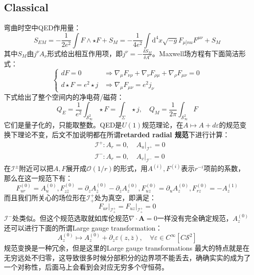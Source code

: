 \subsection{Classical}
弯曲时空中QED作用量：
\begin{equation}
	S_{EM}=-\frac{1}{2e^2}\int{F}\wedge\star F +S_M=-\frac{1}{4e^2}\int \mathrm{d}^4x\sqrt{-g}F_{\mu]nu}F^{\mu\nu}+S_M
\end{equation}
其中$S_M$由$j^\nu A_\nu$形式给出相互作用项，即$j^\nu=-\frac{\delta S_M}{\delta A^\nu}$。Maxwell场方程有下面简洁形式：
\begin{equation}
	\begin{cases}
		dF=0&\Rightarrow \nabla_\mu F_{\nu\rho}+\nabla_\nu F_{\rho\mu}+\nabla_\rho F_{\mu\nu}=0\\
		d\star F=e^2\star j&\Rightarrow \nabla_\mu F_{\mu\nu}=e^2j_\nu
	\end{cases}
\end{equation}
下式给出了整个空间内的净电荷/磁荷：
\begin{equation}
	Q_E=\frac{1}{e^2}\int_{\mathcal{S}^2_\infty}\star F=\int_{\Sigma}\star j,\quad Q_M=\frac{1}{2\pi}\int_{\mathcal{S}^2_\infty} F
\end{equation}
它们是量子化的，只能取整数。QED是$U(1)$规范理论，在$A\mapsto A+d\varepsilon$的规范变换下理论不变，后文不加说明都在所谓\textbf{retarded radial 规范}下进行计算\cite{He:2014cra,Kapec:2015ena}：
\begin{equation}
	\begin{aligned}
		&\mathcal{I}^+: A_r=0,\quad A_u|_{\mathcal{I}^+}=0\\
		&\mathcal{I}^-: A_r=0,\quad A_v|_{\mathcal{I}^-}=0
	\end{aligned}
\end{equation}
在$\mathcal{I}^{\pm}$附近可以把$A,F$展开成$\mathcal{O}(1/r)$的形式，用$A^{(i)},F^{(i)}$表示$r^{-i}$项前的系数，那么在这一规范下有：
\begin{equation}
	F_{ur}^{(0)}=A_u^{(0)}, F_{z\bar z}^{(0)}=\partial_z A_{\bar z}^{(0)}-\partial_{\bar z}A_z^{(0)},F_{uz}^{(0)}=\partial_u A_z^{(0)},F_{rz}^{(0)}=-A_z^{(1)}
\end{equation}
而且我们所关心的场位形在$\mathcal{I}^{+}_{+}$处为真空，即满足：
\begin{equation}
	\left.F_{ur}\right|_{\mathcal{I}_{+}^{+}}=\left.F_{uz}\right|_{\mathcal{I}_{+}^{+}}=0
\end{equation}
$\mathcal{I}^-$处类似。但这个规范选取就如库伦规范$\nabla\cdot \mathbf{A}=0$一样没有完全确定规范，$A^{(0)}_z$还可以进行下面的所谓Large gauge transformation：
\begin{equation}
	A^{(0)}_z\mapsto A^{(0)}_z+\partial_z\varepsilon(z,\bar z),\quad \forall \varepsilon\in C^\infty\left[C\mathcal{S}^2\right]
\end{equation}
规范变换是一种冗余，但是这里的Large gauge transformations 最大的特点就是在无穷远处不归零，这导致很多时候分部积分的边界项不能丢去，确确实实的成为了一个对称性，后面马上会看到会对应无穷多个守恒荷。

